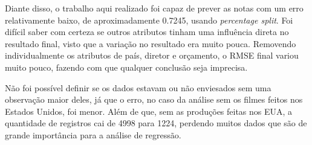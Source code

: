 Diante disso, o trabalho aqui realizado foi capaz de prever as notas com um erro relativamente baixo, de aproximadamente 0.7245, usando \textit{percentage split}. Foi difícil saber com certeza se outros atributos tinham uma influência direta no resultado final, visto que a variação no resultado era muito pouca. Removendo individualmente os atributos de país, diretor e orçamento, o RMSE final variou muito pouco, fazendo com que qualquer conclusão seja imprecisa.

Não foi possível definir se os dados estavam ou não enviesados sem uma observação maior deles, já que o erro, no caso da análise sem os filmes feitos nos Estados Unidos, foi menor. Além de que, sem as produções feitas nos EUA, a quantidade de registros cai de 4998 para 1224, perdendo muitos dados que são de grande importância para a análise de regressão.
